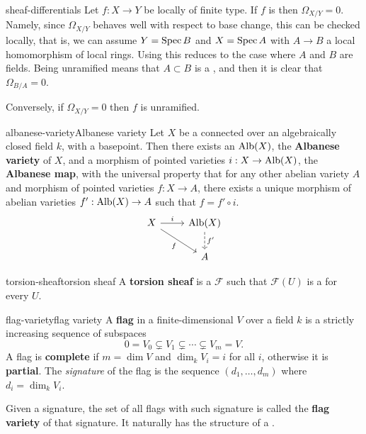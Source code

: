 \begin{example}{sheaf-differentials}
    Let $f : X \to Y$ be locally of finite type. If $f$ is  then $\Omega_{X/Y} = 0$. Namely, since $\Omega_{X/Y}$ behaves well with respect to base change, this can be checked locally, that is, we can assume $Y = \operatorname{Spec} B$ and $X = \operatorname{Spec} A$ with $A \to B$ a local homomorphism of local rings. Using  this reduces to the case where $A$ and $B$ are fields. Being unramified means that $A \subset B$ is a , and then it is clear that $\Omega_{B/A} = 0$.
    
    Conversely, if $\Omega_{X/Y} = 0$ then $f$ is unramified.
\end{example}

\begin{topic}{albanese-variety}{Albanese variety}
    Let $X$ be a connected   over an algebraically closed field $k$, with a basepoint. Then there exists an  $\textup{Alb}(X)$, the \textbf{Albanese variety} of $X$, and a morphism of pointed varieties $i : X \to \textup{Alb}(X)$, the \textbf{Albanese map}, with the universal property that for any other abelian variety $A$ and morphism of pointed varieties $f : X \to A$, there exists a unique morphism of abelian varieties $f' : \textup{Alb}(X) \to A$ such that $f = f' \circ i$.
    \[ \begin{tikzcd} X \arrow{r}{i} \arrow[swap]{dr}{f} &  \textup{Alb}(X) \arrow[dashed]{d}{f'} \\ &  A \end{tikzcd} \]
\end{topic}

\begin{topic}{torsion-sheaf}{torsion sheaf}
    A \textbf{torsion sheaf} is a  $\mathcal{F}$ such that $\mathcal{F}(U)$ is a   for every $U$.
\end{topic}

\begin{topic}{flag-variety}{flag variety}
    A \textbf{flag} in a finite-dimensional  $V$ over a field $k$ is a strictly increasing sequence of subspaces
    \[ 0 = V_0 \subsetneq V_1 \subsetneq \cdots \subsetneq V_m = V . \]
    A flag is \textbf{complete} if $m = \dim V$ and $\dim_k V_i = i$ for all $i$, otherwise it is \textbf{partial}. The \textit{signature} of the flag is the sequence $(d_1, \ldots, d_m)$ where $d_i = \dim_k V_i$.
    
    Given a signature, the set of all flags with such signature is called the \textbf{flag variety} of that signature. It naturally has the structure of a  .
\end{topic}

